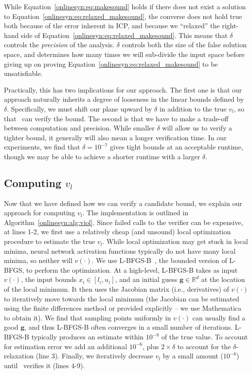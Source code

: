 While Equation~\ref{onlinesyn:eq:makesound} holds if there does not exist a
solution to
Equation~\ref{onlinesyn:eq:relaxed_makesound}, the converse does not hold true both
because of the error inherent in ICP, and because
we ``relaxed'' the right-hand side of
Equation~\ref{onlinesyn:eq:relaxed_makesound}.
This means that $ \delta $ controls the
\textit{precision} of the analysis. $ \delta $ controls both the size of the
false solution space, and determines how many times we will sub-divide the
input space before giving up on proving
Equation~\ref{onlinesyn:eq:relaxed_makesound} to
be unsatisfiable.

Practically, this has two implications for our approach. The first one is that our
approach naturally inherits a degree of looseness in the linear bounds defined
by $ \delta $. Specifically, we must shift our plane upward by $
\delta $ in addition to the true $ v_l $, so that~\dReal{} can verify the
bound. The second is that we have to make a trade-off between computation and precision. While
smaller $ \delta $ will allow us to verify a tighter bound, it generally will
also mean a longer verification time.
In our experiments, we find that $ \delta = 10^{-7} $ gives tight bounds at an
acceptable runtime, though we may be able to achieve a shorter  runtime with a
larger $\delta$.

\subsection{Computing $ v_l $}
Now that we have defined how we can verify a candidate bound, we explain our
approach for computing $ v_l $. The implementation is outlined in
Algorithm~\ref{onlinesyn:alg:viol}. Since failed calls to the verifier can be
expensive, at lines 1-2, we first use a relatively cheap (and unsound) local
optimization procedure to estimate the true $ v_l $.
%
While local optimization may get stuck
in local minima, neural network activation functions typically do not have many
local minima, so neither will $ v(\cdot) $.
%
We use L-BFGS-B~\cite{byrd1995limited}, the bounded version of L-BFGS, to
perform the optimization. At a high-level, L-BFGS-B takes as input $ v(\cdot)
$, the input bounds $ x_i \in [l_i, u_i] $, and an initial guess $ \textbf{g}
\in
\mathbb{R}^d $ at the location of the local minimum.
%
It then uses the
Jacobian matrix (i.e., derivatives) of $ v(\cdot) $ to iteratively move towards
the local minimum (the Jacobian can be estimated using the finite differences
method or provided explicitly -- we use Mathematica~\cite{Mathematica} to
obtain it).
%
We find that sampling points uniformly in $ v(\cdot) $ can usually find a good
$ \textbf{g} $, and thus L-BFGS-B often converges in a small number of
iterations.
L-BFGS-B typically produces an estimate within $ 10^{-8} $ of the true value.
%
To account for estimation error we add an additional $ 10^{-6} $, plus $ 2
\times \delta $ to account for the $ \delta $-relaxation (line 3).
%
Finally, we
iteratively decrease $ v_l $ by a small amount ($ 10^{-6} $)
until~\dReal{} verifies it (lines 4-9).


